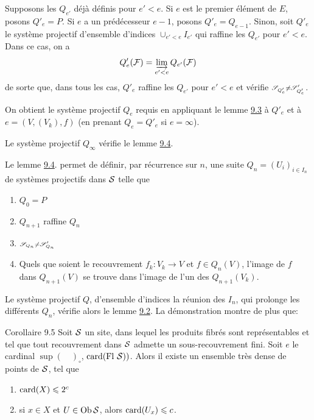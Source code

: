 \documentclass[10pt]{../fichiers-configuration-latex/smfart}
\begin{document}
Supposons les $Q_{e'}$ déjà définis pour $e'< e$. Si $e$ est le
premier élément de $E$, posons $Q'_e = P$. Si $e$ a un prédécesseur
$e-1$, posons $Q'_e = Q_{e-1}$. Sinon, soit $Q'_e$ le système
projectif d'ensemble d'indices $\cup_{e' < e}
I_{e'}$ qui raffine les $Q_{e'}$ pour $e' < e$. Dans ce cas, on a
$$
Q'_e (\Ff) = \varinjlim_{e' < e} Q_{e'} (\Ff)
$$
de \pageoriginale sorte que, dans tous les cas, $Q'_e$ raffine les
$Q_{e'}$ pour $e'< e$ et vérifie $\ss_{Q'_e} \neq \ss'_{Q'_e}$.

On obtient le système projectif $Q_e$ requis en appliquant le lemme
\hyperref[VI.lem9.3]{9.3} à $Q'_e$ et à $e = (V, (V_k), f)$ (\resp en prenant $Q_e =
Q'_e$ si $e = \infty$).

Le système projectif $Q_{\infty}$ vérifie le lemme \hyperref[VI.lem9.4]{9.4}.

Le lemme \hyperref[VI.lem9.4]{9.4}. permet de définir, par récurrence sur $n$, une suite
$Q_n = (U_i)_{i \in I_n}$ de systèmes projectifs dans $\Ss$ telle que
\begin{enumerate}
\renewcommand{\theenumi}{\roman{enumi}}
\renewcommand{\labelenumi}{(\theenumi)}
\item $Q_0 = P$

\item $Q_{n+1}$ raffine $Q_n$

\item $\ss_{Q_n} \neq \ss'_{Q_n}$

\item Quels que soient le recouvrement $f_k : V_k \to V$ et $f \in Q_n
  (V)$, l'image de $f$ dans $Q_{n+1} (V)$ se trouve dans l'image de
  l'un des $Q_{n+1} (V_k)$.
\end{enumerate}

Le système projectif $Q$, d'ensemble d'indices la réunion des $I_n$,
qui prolonge les différents $Q_n$, vérifie alors le lemme \hyperref[VI.lem9.2]{9.2}. La
démonstration montre de plus que:

\begin{enonce*}{Corollaire 9.5}
Soit $\Ss$ un site, dans lequel les produits fibrés sont représentables
et tel que tout recouvrement dans $\Ss$ admette un sous-recouvrement
fini. Soit $e$ le cardinal $\sup(\quad)_{\circ}$, $\card(\text{\rm Fl }
\Ss))$. Alors il existe un ensemble très dense de points de
$\Ss$, tel que
\begin{enumerate}
\renewcommand{\theenumi}{\roman{enumi}}
\renewcommand{\labelenumi}{(\theenumi)}
\item $\card(X) \leq 2^c$

\item si $x \in X$ et $U \in \Ob \Ss$, alors $\card(U_x) \leq c$.
\end{enumerate}
\end{enonce*}
\end{document}
